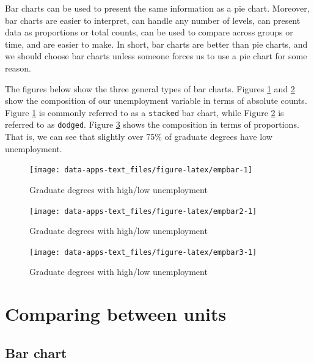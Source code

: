 \documentclass[
]{book}
\begin{document}
Bar charts can be used to present the same information as a pie chart. Moreover, bar charts are easier to interpret, can handle any number of levels, can present data as proportions or total counts, can be used to compare across groups or time, and are easier to make. In short, bar charts are better than pie charts, and we should choose bar charts unless someone forces us to use a pie chart for some reason.

The figures below show the three general types of bar charts. Figures \ref{fig:empbar} and \ref{fig:empbar2} show the composition of our unemployment variable in terms of absolute counts. Figure \ref{fig:empbar} is commonly referred to as a \texttt{stacked} bar chart, while Figure \ref{fig:empbar2} is referred to as \texttt{dodged}. Figure \ref{fig:empbar3} shows the composition in terms of proportions. That is, we can see that slightly over 75\% of graduate degrees have low unemployment.

\begin{figure}

{\centering \texttt{[image: data-apps-text\_files/figure-latex/empbar-1]} 

}

\caption{Graduate degrees with high/low unemployment}\label{fig:empbar}
\end{figure}

\begin{figure}

{\centering \texttt{[image: data-apps-text\_files/figure-latex/empbar2-1]} 

}

\caption{Graduate degrees with high/low unemployment}\label{fig:empbar2}
\end{figure}

\begin{figure}

{\centering \texttt{[image: data-apps-text\_files/figure-latex/empbar3-1]} 

}

\caption{Graduate degrees with high/low unemployment}\label{fig:empbar3}
\end{figure}

\hypertarget{comparing-between-units}{%
\section{Comparing between units}\label{comparing-between-units}}

\hypertarget{bar-chart-1}{%
\subsection{Bar chart}\label{bar-chart-1}}
\end{document}
